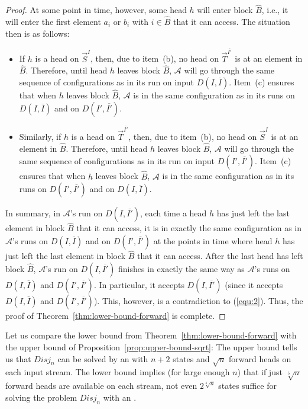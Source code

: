 \documentclass[proceedings]{stacs}
\theoremstyle{plain}\newtheorem{satz}[thm]{Satz}
\theoremstyle{definition}\newtheorem{crucial}[thm]{Crucial Definition}
\newcommand{\ov}[1]{\overline{#1}}
\newcommand{\vek}[1]{\vec{#1}}
\newcommand*{\A}{\ensuremath{\mathcal{A}}}
\newenvironment{mi}{\begin{itemize}}{\end{itemize}}
\newcommand{\Disj}{\ensuremath{\textit{Disj}}}
\newcommand{\aut}{\text{mp2s-automaton}}
\begin{document}
\begin{proof}
At some point in time, however, some head $h$ will enter block $\hat{B}$, 
i.e., it will enter the first element $a_i$ or $b_i$ with $i\in \hat{B}$ that 
it can access.
The situation then is as follows: \vspace{1ex}
\begin{mi}
 \item 
   If $h$ is a head on $\vek{S}^{I}$, then, due to item~(b), no head on 
   $\vek{T}^{\ov{I'}}$ is at an element in $\hat{B}$. 
   Therefore, until head $h$ leaves block $\hat{B}$, $\A$ will go through the 
   same sequence of configurations as in its run on input $D(I,\ov{I})$. 
   Item~(c) ensures that when $h$ leaves block $\hat{B}$, $\A$ is in the same configuration
   as in its runs on $D(I,\ov{I})$ and on $D(I',\ov{I'})$.
  \vspace{1ex}
 \item
   Similarly, if $h$ is a head on $\vek{T}^{\ov{I'}}$, then, due to item~(b), no head on 
   $\vek{S}^{I}$ is at an element in $\hat{B}$. 
   Therefore, until head $h$ leaves block $\hat{B}$, $\A$ will go through the 
   same sequence of configurations as in its run on input $D(I',\ov{I'})$. 
   Item~(c) ensures that when $h$ leaves block $\hat{B}$, $\A$ is in the same configuration
   as in its runs on $D(I',\ov{I'})$ and on $D(I,\ov{I})$.
  \vspace{1ex}
\end{mi}

\noindent
In summary, in $\A$'s run on $D(I,\ov{I'})$, each time a head $h$ has just left the
last element in block $\hat{B}$ that it can access, it is in exactly the same 
configuration as in $\A$'s runs on $D(I,\ov{I})$ and on $D(I',\ov{I'})$ at the points
in time where head $h$ has just left the
last element in block $\hat{B}$ that it can access.
After the last head has left block $\hat{B}$, $\A$'s run on $D(I,\ov{I'})$ finishes
in exactly the same way as $\A$'s runs on $D(I,\ov{I})$ and $D(I',\ov{I'})$. 
In particular, it accepts $D(I,\ov{I'})$ (since it accepts $D(I,\ov{I})$ and
$D(I',\ov{I'})$). This, however, is a contradiction to (\ref{equ:2}).
Thus, the proof of Theorem~\ref{thm:lower-bound-forward} is complete.
\end{proof}

\medskip

\begin{remark}
Let us compare the lower bound from Theorem~\ref{thm:lower-bound-forward} 
with the upper bound of Proposition~\ref{prop:upper-bound-sqrt}: The upper bound
tells us that $\Disj_n$ can be solved by an \aut{} with $n{+}2$ states and
$\sqrt{n}$ forward heads on each input stream. The lower bound
implies (for large enough $n$) that
if just $\sqrt[5]{n}$ forward heads are available on each stream, not even
$2^{\sqrt[3]{n}}$ states suffice for solving the problem $\Disj_n$ with an
\aut{}.
\end{remark}
\end{document}
